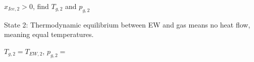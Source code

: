 \( x_{Ice,2} > 0 \), find \( T_{g,2} \) and \( p_{g,2} \)  

State 2: Thermodynamic equilibrium between EW and gas means no heat flow, meaning equal temperatures.  

\( T_{g,2} = T_{EW,2} \), \( p_{g,2} = \)